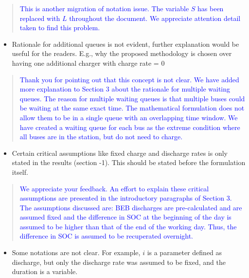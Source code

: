\documentclass[11pt,a4paper,final]{article}
\begin{document}
\begin{quote}
\textcolor{blue}{This is another migration of notation issue. The variable $S$ has been replaced with $L$ throughout the document. We appreciate attention detail taken to find this problem.}
\end{quote}

\begin{itemize}
\item Rationale for additional queues is not evident, further explanation would be useful for the readers. E.g., why the proposed methodology is chosen over having one additional charger with charge rate = 0
\end{itemize}


\begin{quote}
\textcolor{blue}{Thank you for pointing out that this concept is not clear. We have added more explanation to Section 3 about the rationale for multiple waiting queues. The reason for multiple waiting queues is that multiple buses could be waiting at the same exact time. The mathematical formulation does not allow them to be in a single queue with an overlapping time window. We have created a waiting queue for each bus as the extreme condition where all buses are in the station, but do not need to charge.}
\end{quote}

\begin{itemize}
\item Certain critical assumptions like fixed charge and discharge rates is only stated in the results (section -1). This should be stated before the formulation itself.
\end{itemize}

\begin{quote}
\textcolor{blue}{We appreciate your feedback. An effort to explain these critical assumptions are presented in the introductory paragraphs of Section 3. The assumptions discussed are: BEB discharges are pre-calculated and are assumed fixed and the difference in SOC at the beginning of the day is assumed to be higher than that of the end of the working day. Thus, the difference in SOC is assumed to be recuperated overnight.}
\end{quote}

\begin{itemize}
\item Some notations are not clear. For example, \(i\) is a parameter defined as discharge, but only the discharge rate was assumed to be fixed, and the duration is a variable.
\end{itemize}
\end{document}
